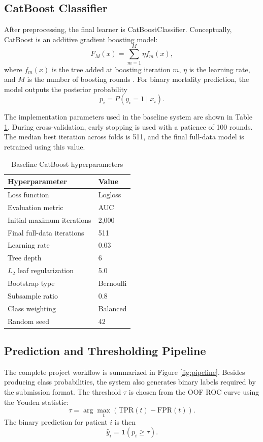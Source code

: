 \documentclass[a4paper,12pt]{extreport}
\begin{document}
\subsection{CatBoost Classifier}
After preprocessing, the final learner is CatBoostClassifier. Conceptually, CatBoost is an additive gradient boosting model:
\[
F_M(x) = \sum_{m=1}^{M} \eta f_m(x),
\]
where \(f_m(x)\) is the tree added at boosting iteration \(m\), \(\eta\) is the learning rate, and \(M\) is the number of boosting rounds \cite{prokhorenkova2018catboost}. For binary mortality prediction, the model outputs the posterior probability
\[
p_i = P(y_i = 1 \mid x_i).
\]

The implementation parameters used in the baseline system are shown in Table \ref{tab:hyperparams}. During cross-validation, early stopping is used with a patience of 100 rounds. The median best iteration across folds is 511, and the final full-data model is retrained using this value.

\begin{table}[H]
    \centering
    \caption{Baseline CatBoost hyperparameters}
    \label{tab:hyperparams}
    \begin{tabularx}{\textwidth}{lX}
        \toprule
        \textbf{Hyperparameter} & \textbf{Value} \\
        \midrule
        Loss function & Logloss \\
        Evaluation metric & AUC \\
        Initial maximum iterations & 2{,}000 \\
        Final full-data iterations & 511 \\
        Learning rate & 0.03 \\
        Tree depth & 6 \\
        \(L_2\) leaf regularization & 5.0 \\
        Bootstrap type & Bernoulli \\
        Subsample ratio & 0.8 \\
        Class weighting & Balanced \\
        Random seed & 42 \\
        \bottomrule
    \end{tabularx}
\end{table}

\subsection{Prediction and Thresholding Pipeline}
The complete project workflow is summarized in Figure \ref{fig:pipeline}. Besides producing class probabilities, the system also generates binary labels required by the submission format. The threshold \(\tau\) is chosen from the OOF ROC curve using the Youden statistic:
\[
\tau = \arg\max_t \left(\mathrm{TPR}(t) - \mathrm{FPR}(t)\right).
\]
The binary prediction for patient \(i\) is then
\[
\hat{y}_i = \mathbf{1}(p_i \ge \tau).
\]
\end{document}
